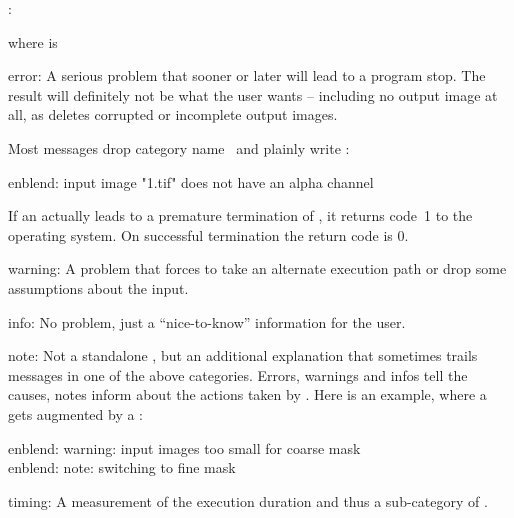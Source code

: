 \begin{literal}
  \app:  
\end{literal}

\noindent where  is

\begin{codelist}
\item[error:] A serious problem that sooner or later will lead to a program stop.  The result
  will definitely not be what the user wants -- including no output image at all, as \appcmd{}
  deletes corrupted or incomplete output images.

  Most messages drop category name~ and plainly write :

  \begin{literal}
    enblend: input image "1.tif" does not have an alpha channel
  \end{literal}

  If an  actually leads to a premature termination of \appcmd, it returns code~1
  to the operating system.  On successful termination the return code is 0.

\item[warning:] A problem that forces \appcmd{} to take an alternate execution path or drop some
  assumptions about the input.

\item[info:] No problem, just a ``nice-to-know'' information for the user.

\item[note:] Not a standalone , but an additional explanation that sometimes
  trails messages in one of the above categories.  Errors, warnings and infos tell the causes,
  notes inform about the actions taken by \appcmd{}.  Here is an example, where a 
  gets augmented by a :

  \begin{literal}
    enblend: warning: input images too small for coarse mask \\
    enblend: note: switching to fine mask
  \end{literal}

\item[timing:] A measurement of the execution duration and thus a sub\hyp{}category of
  .
\end{codelist}


